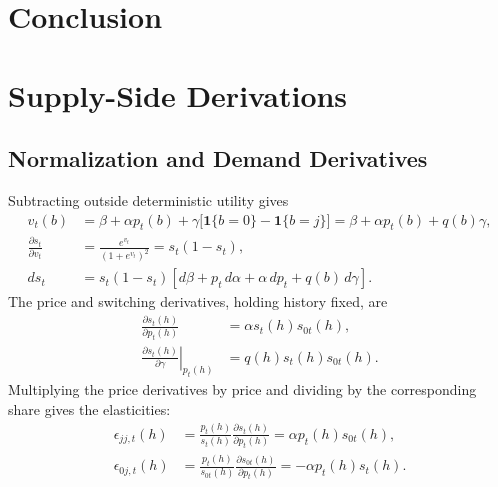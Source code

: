 \documentclass[12pt]{article}
\theoremstyle{definition}
\theoremstyle{remark}
\begin{document}

\section{Conclusion}
\label{sec:conclusion}








\newpage
\appendix

\section{Supply-Side Derivations}
\label{app:supply}
\allowdisplaybreaks[1]

\subsection{Normalization and Demand Derivatives}
Subtracting outside deterministic utility gives
\begin{align}
 v_t(b)&=\beta+\alpha p_t(b)
 +\gamma\bigl[\mathbf{1}\{b=0\}-\mathbf{1}\{b=j\}\bigr]
 =\beta+\alpha p_t(b)+q(b)\gamma,\\
 \frac{\partial s_t}{\partial v_t}&=\frac{e^{v_t}}{(1+e^{v_t})^2}
 =s_t(1-s_t),\\
 ds_t&=s_t(1-s_t)[d\beta+p_t\,d\alpha+\alpha\,dp_t+q(b)\,d\gamma].
 \label{eq:supply-total-share}
\end{align}
The price and switching derivatives, holding history fixed, are
\begin{align}
 \frac{\partial s_t(h)}{\partial p_t(h)}&=\alpha s_t(h)s_{0t}(h),\\
 \left.\frac{\partial s_t(h)}{\partial\gamma}\right|_{p_t(h)}
 &=q(h)s_t(h)s_{0t}(h).
\end{align}
Multiplying the price derivatives by price and dividing by the corresponding
share gives the elasticities:
\begin{align}
 \epsilon_{jj,t}(h)&=\frac{p_t(h)}{s_t(h)}
 \frac{\partial s_t(h)}{\partial p_t(h)}
 =\alpha p_t(h)s_{0t}(h),\\
 \epsilon_{0j,t}(h)&=\frac{p_t(h)}{s_{0t}(h)}
 \frac{\partial s_{0t}(h)}{\partial p_t(h)}
 =-\alpha p_t(h)s_t(h).
\end{align}
\end{document}
